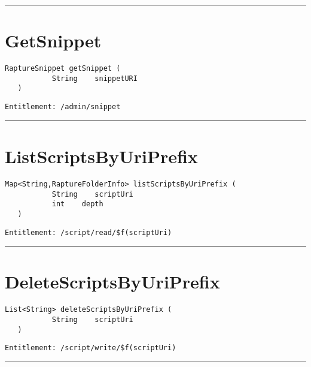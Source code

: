 \rule{12cm}{2pt}
\section{GetSnippet}
\label{Api:GetSnippet}
\begin{lstlisting}[style=nonumbers]
   RaptureSnippet getSnippet (
           String    snippetURI
   )
\end{lstlisting}
\begin{Verbatim}[formatcom=\color{Maroon}]
  Entitlement: /admin/snippet
\end{Verbatim}



\rule{12cm}{2pt}
\section{ListScriptsByUriPrefix}
\label{Api:ListScriptsByUriPrefix}
\begin{lstlisting}[style=nonumbers]
   Map<String,RaptureFolderInfo> listScriptsByUriPrefix (
           String    scriptUri
           int    depth
   )
\end{lstlisting}
\begin{Verbatim}[formatcom=\color{Maroon}]
  Entitlement: /script/read/$f(scriptUri)
\end{Verbatim}



\rule{12cm}{2pt}
\section{DeleteScriptsByUriPrefix}
\label{Api:DeleteScriptsByUriPrefix}
\begin{lstlisting}[style=nonumbers]
   List<String> deleteScriptsByUriPrefix (
           String    scriptUri
   )
\end{lstlisting}
\begin{Verbatim}[formatcom=\color{Maroon}]
  Entitlement: /script/write/$f(scriptUri)
\end{Verbatim}



\rule{12cm}{2pt}
